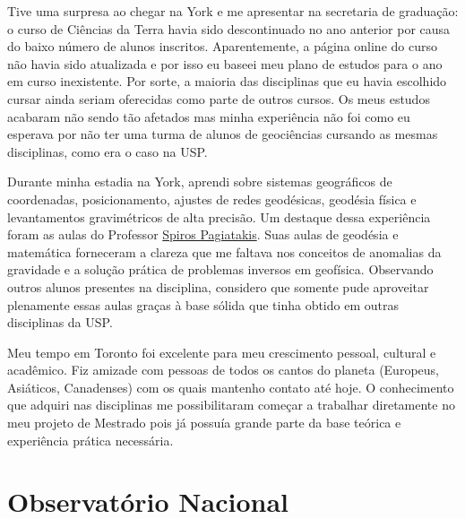 \documentclass[10pt,a4paper,oneside]{book}
\begin{document}
Tive uma surpresa ao chegar na York e me apresentar na secretaria de graduação:
o curso de Ciências da Terra havia sido descontinuado no ano anterior por causa
do baixo número de alunos inscritos.
Aparentemente, a página online do curso não havia sido atualizada e por isso
eu baseei meu plano de estudos para o ano em curso inexistente.
Por sorte, a maioria das disciplinas que eu havia escolhido cursar ainda
seriam oferecidas como parte de outros cursos.
Os meus estudos acabaram não sendo tão afetados mas minha experiência não foi
como eu esperava por não ter uma turma de alunos de geociências cursando as
mesmas disciplinas, como era o caso na USP.

Durante minha estadia na York, aprendi sobre sistemas geográficos de
coordenadas, posicionamento, ajustes de redes geodésicas, geodésia física e
levantamentos gravimétricos de alta precisão.
Um destaque dessa experiência foram as aulas do Professor
\href{https://www.yorku.ca/spiros/spiros.html}{Spiros Pagiatakis}.
Suas aulas de geodésia e matemática forneceram a clareza que me faltava nos
conceitos de anomalias da gravidade e a solução prática de problemas inversos
em geofísica.
Observando outros alunos presentes na disciplina, considero que somente pude
aproveitar plenamente essas aulas graças à base sólida que tinha obtido em
outras disciplinas da USP.

Meu tempo em Toronto foi excelente para meu crescimento pessoal, cultural e
acadêmico.
Fiz amizade com pessoas de todos os cantos do planeta (Europeus, Asiáticos,
Canadenses) com os quais mantenho contato até hoje.
O conhecimento que adquiri nas disciplinas me possibilitaram começar a
trabalhar diretamente no meu projeto de Mestrado pois já possuía grande parte
da base teórica e experiência prática necessária.


\section{Observatório Nacional}
\label{sec_on}
\end{document}
